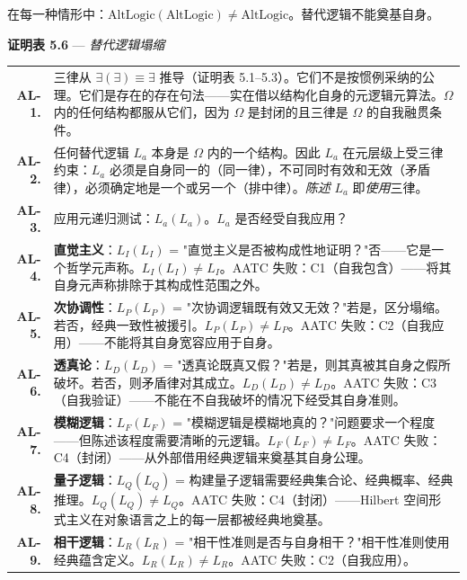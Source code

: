 \documentclass[10pt, openany, oneside]{book}
\renewcommand{\footnotesize}{\fontsize{8.5}{11}\selectfont}
\begin{document}
\noindent 在每一种情形中：$\text{AltLogic}(\text{AltLogic}) \neq \text{AltLogic}$。替代逻辑不能奠基自身。

\vspace{0.5em}

\textbf{证明表 5.6} --- \textit{替代逻辑塌缩}

\vspace{0.5em}

{\footnotesize
\noindent\begin{tabular}{r p{}}
\textbf{AL-1.} & 三律从 $\exists(\exists) \equiv \exists$ 推导（证明表 5.1--5.3）。它们不是按惯例采纳的公理。它们是存在的存在句法——实在借以结构化自身的元逻辑元算法。$\Omega$ 内的任何结构都服从它们，因为 $\Omega$ 是封闭的且三律是 $\Omega$ 的自我融贯条件。\\[0.3em]
\textbf{AL-2.} & 任何替代逻辑 $L_a$ 本身是 $\Omega$ 内的一个结构。因此 $L_a$ 在元层级上受三律约束：$L_a$ 必须是自身同一的（同一律），不可同时有效和无效（矛盾律），必须确定地是一个或另一个（排中律）。\textit{陈述} $L_a$ 即\textit{使用}三律。\\[0.3em]
\textbf{AL-3.} & 应用元递归测试：$L_a(L_a)$。$L_a$ 是否经受自我应用？\\[0.3em]
\textbf{AL-4.} & \textbf{直觉主义}：$L_I(L_I)$ = "直觉主义是否被构成性地证明？"否——它是一个哲学元声称。$L_I(L_I) \neq L_I$。AATC 失败：C1（自我包含）——将其自身元声称排除于其构成性范围之外。\\[0.3em]
\textbf{AL-5.} & \textbf{次协调性}：$L_P(L_P)$ = "次协调逻辑既有效又无效？"若是，区分塌缩。若否，经典一致性被援引。$L_P(L_P) \neq L_P$。AATC 失败：C2（自我应用）——不能将其自身宽容应用于自身。\\[0.3em]
\textbf{AL-6.} & \textbf{透真论}：$L_D(L_D)$ = "透真论既真又假？"若是，则其真被其自身之假所破坏。若否，则矛盾律对其成立。$L_D(L_D) \neq L_D$。AATC 失败：C3（自我验证）——不能在不自我破坏的情况下经受其自身准则。\\[0.3em]
\textbf{AL-7.} & \textbf{模糊逻辑}：$L_F(L_F)$ = "模糊逻辑是模糊地真的？"问题要求一个程度——但陈述该程度需要清晰的元逻辑。$L_F(L_F) \neq L_F$。AATC 失败：C4（封闭）——从外部借用经典逻辑来奠基其自身公理。\\[0.3em]
\textbf{AL-8.} & \textbf{量子逻辑}：$L_Q(L_Q)$ = 构建量子逻辑需要经典集合论、经典概率、经典推理。$L_Q(L_Q) \neq L_Q$。AATC 失败：C4（封闭）——Hilbert 空间形式主义在对象语言之上的每一层都被经典地奠基。\\[0.3em]
\textbf{AL-9.} & \textbf{相干逻辑}：$L_R(L_R)$ = "相干性准则是否与自身相干？"相干性准则使用经典蕴含定义。$L_R(L_R) \neq L_R$。AATC 失败：C2（自我应用）。\\[0.3em]

\end{tabular}}
\end{document}
